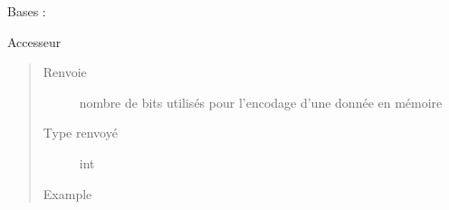 \documentclass[letterpaper,10pt,french]{sphinxmanual}
\begin{document}
\begin{fulllineitems}
\label{\detokenize{processorengine:processorengine.ProcessorEngine}}
Bases : 

\begin{fulllineitems}
\label{\detokenize{processorengine:processorengine.ProcessorEngine.AVAILABLE_ENGINES}}
\end{fulllineitems}


\begin{fulllineitems}
\label{\detokenize{processorengine:processorengine.ProcessorEngine.dataBits}}
Accesseur
\begin{quote}\begin{description}
\item[{Renvoie}] \leavevmode
nombre de bits utilisés pour l’encodage d’une donnée en mémoire

\item[{Type renvoyé}] \leavevmode
int

\item[{Example}] \leavevmode
\begin{sphinxVerbatim}[commandchars=\\\{\}]
\end{sphinxVerbatim}

\end{description}\end{quote}

\end{fulllineitems}


\end{fulllineitems}
\end{document}
